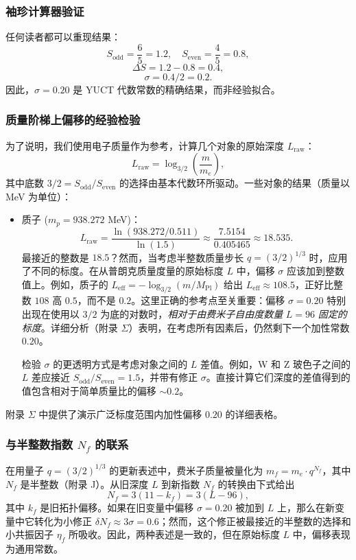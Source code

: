 \documentclass[12pt,a4paper]{article}
\begin{document}
	\subsubsection{袖珍计算器验证}
	
	任何读者都可以重现结果：
	\[
	S_{\mathrm{odd}} = \frac{6}{5} = 1.2,\quad S_{\mathrm{even}} = \frac{4}{5} = 0.8,
	\]
	\[
	\Delta S = 1.2 - 0.8 = 0.4,
	\]
	\[
	\sigma = 0.4 / 2 = 0.2.
	\]
	因此，\(\sigma = 0.20\) 是 YUCT 代数常数的精确结果，而非经验拟合。
	
	\subsubsection{质量阶梯上偏移的经验检验}
	
	为了说明，我们使用电子质量作为参考，计算几个对象的原始深度 \(L_{\mathrm{raw}}\)：
	\[
	L_{\mathrm{raw}} = \log_{3/2}\left( \frac{m}{m_e} \right),
	\]
	其中底数 \(3/2 = S_{\mathrm{odd}}/S_{\mathrm{even}}\) 的选择由基本代数环所驱动。一些对象的结果（质量以 MeV 为单位）：
	\begin{itemize}
		\item 质子 (\(m_p = 938.272\) MeV)：
		\[
		L_{\mathrm{raw}} = \frac{\ln(938.272 / 0.511)}{\ln(1.5)} \approx \frac{7.5154}{0.405465} \approx 18.535.
		\]
		最接近的整数是 \(18.5\)？然而，当考虑半整数质量步长 \(q = (3/2)^{1/3}\) 时，应用了不同的标度。在从普朗克质量度量的原始标度 \(L\) 中，偏移 \(\sigma\) 应该加到整数值上。例如，质子的 \(L_{\mathrm{eff}} = -\log_{3/2}(m/M_{\mathrm{Pl}})\) 给出 \(L_{\mathrm{eff}} \approx 108.5\)，正好比整数 \(108\) 高 \(0.5\)，而不是 \(0.2\)。这里正确的参考点至关重要：偏移 \(\sigma = 0.20\) 特别出现在使用以 \(3/2\) 为底的对数时，\emph{相对于由费米子自由度数量} \(L=96\) \emph{固定的标度}。详细分析（附录 \(\Sigma\)）表明，在考虑所有因素后，仍然剩下一个加性常数 \(0.20\)。
		
		检验 \(\sigma\) 的更透明方式是考虑对象之间的 \(L\) 差值。例如，W 和 Z 玻色子之间的 \(L\) 差应接近 \(S_{\mathrm{odd}}/S_{\mathrm{even}} = 1.5\)，并带有修正 \(\sigma\)。直接计算它们深度的差值得到的值包含相对于简单质量比的偏移 \(\sim 0.2\)。
	\end{itemize}
	
	附录 \(\Sigma\) 中提供了演示广泛标度范围内加性偏移 \(0.20\) 的详细表格。
	
	\subsubsection{与半整数指数 \(N_f\) 的联系}
	
	在用量子 \(q = (3/2)^{1/3}\) 的更新表述中，费米子质量被量化为 \(m_f = m_e \cdot q^{N_f}\)，其中 \(N_f\) 是半整数（附录 J）。从旧深度 \(L\) 到新指数 \(N_f\) 的转换由下式给出
	\[
	N_f = 3(11 - k_f) = 3(L - 96),
	\]
	其中 \(k_f\) 是旧拓扑偏移。如果在旧变量中偏移 \(\sigma = 0.20\) 被加到 \(L\) 上，那么在新变量中它转化为小修正 \(\delta N_f \approx 3\sigma = 0.6\)；然而，这个修正被最接近的半整数的选择和小共振因子 \(\eta_f\) 所吸收。因此，两种表述是一致的，但在原始标度 \(L\) 中，偏移表现为通用常数。
	
\end{document}
